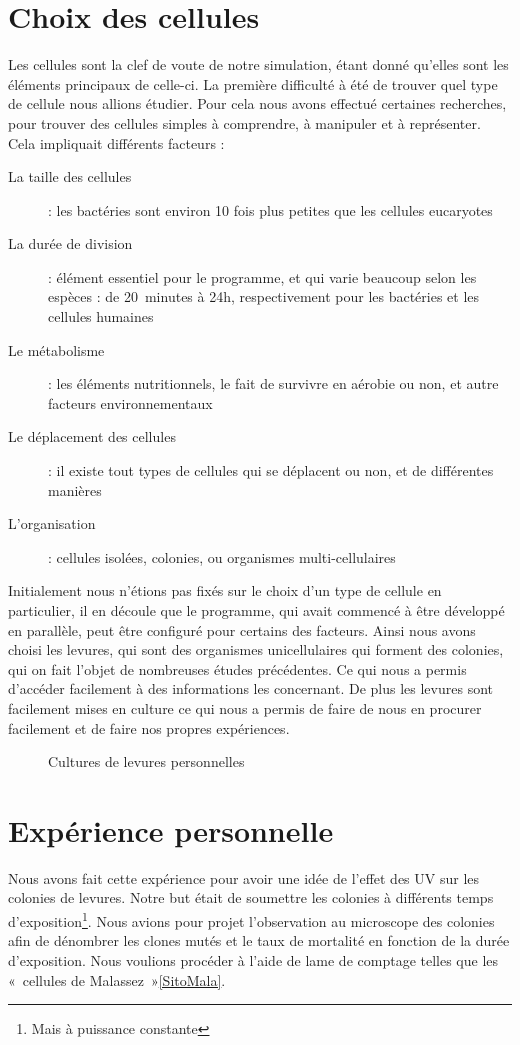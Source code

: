 \section{Choix des cellules}
Les cellules sont la clef de voute de notre simulation, étant donné qu'elles sont les éléments principaux de celle-ci. 
La première difficulté à été de trouver quel type de cellule nous allions étudier. Pour cela nous avons effectué certaines recherches, pour trouver des cellules simples à comprendre, à manipuler et à représenter.
Cela impliquait différents facteurs : 
\begin{description}
  \item[La taille des cellules] : les bactéries sont environ 10 fois plus petites que les cellules eucaryotes 
  \item[La durée de division] : élément essentiel pour le programme, et qui varie beaucoup selon les espèces : de 20 minutes à 24h, respectivement pour les bactéries et les cellules humaines
  \item[Le métabolisme] : les éléments nutritionnels, le fait de survivre en aérobie ou non, et autre facteurs environnementaux
  \item[Le déplacement des cellules] : il existe tout types de cellules qui se déplacent ou non, et de différentes manières
  \item[L'organisation] : cellules isolées, colonies, ou organismes multi-cellulaires
\end{description}

Initialement nous n'étions pas fixés sur le choix d'un type de cellule en particulier, il en découle que le programme, qui avait commencé à être développé en parallèle, peut être configuré pour certains des facteurs.
Ainsi nous avons choisi les levures, qui sont des organismes unicellulaires qui forment des colonies, qui on fait l'objet de nombreuses études précédentes. Ce qui nous a permis d'accéder facilement à des informations les concernant.
De plus les levures sont facilement mises en culture ce qui nous a permis de faire de nous en procurer facilement et de faire nos propres expériences. 

\begin{figure}
  \caption{Cultures de levures personnelles}
\end{figure}

\section{Expérience personnelle}
Nous avons fait cette expérience pour avoir une idée de l'effet des UV sur les colonies de levures. 
Notre but était de soumettre les colonies à différents temps d'exposition\footnote{Mais à puissance constante}. 
Nous avions pour projet l'observation au microscope des colonies afin de dénombrer les clones mutés et le 
taux de mortalité en fonction de la durée d'exposition.
Nous voulions procéder à l'aide de lame de comptage telles que les «~cellules de Malassez~»\ref{SitoMala}.

